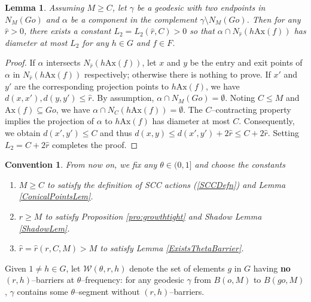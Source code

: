\documentclass{amsart}
\newtheorem{lem}[thm]{Lemma}
\newtheorem{conv}[thm]{Convention}
\theoremstyle{definition}
\theoremstyle{remark}
\newcommand{\ax}{\mathrm{Ax}}
\begin{document}
\begin{lem}\label{ThinRegion}
Assuming $M\ge C$, let $\gamma$ be a geodesic with two endpoints in $N_M(Go)$ and $\alpha$ be a component  in the complement $\gamma\setminus  N_M(Go)$. Then for any $\hat r>0$, there exists a constant $L_2=L_2(\hat r,C)>0$ so that $\alpha\cap N_{\hat r}(h\ax(f))$ has diameter at most $L_2$ for any $h\in G$ and $f\in F$.   
\end{lem}
\begin{proof}
If $\alpha$ intersects $N_{\hat r}(h\ax(f))$, let $x$ and $y$ be the entry and exit points of $\alpha$ in $N_{\hat r}(h\ax(f))$ respectively; otherwise there is nothing to prove. If $x'$ and $y'$ are the corresponding projection points to $h\ax(f)$, we have $d(x,x'), d(y,y')\le \hat r$.
By assumption, $\alpha\cap N_M(Go)=\emptyset$. Noting $C\le M$ and $\ax(f)\subseteq Go$,  we have $\alpha\cap N_C(h\ax(f))=\emptyset$. The  $C$--contracting property implies the projection of $\alpha$ to $h\ax(f)$ has diameter at most $C$.  Consequently, we obtain $d(x',y')\le C$ and thus $d(x,y)\le d(x',y')+2\hat r\le C+2\hat r$. Setting  $L_2=C+2\hat r$  completes the proof.
\end{proof}
\begin{conv}\label{ConventionrM} 
From now on, we fix any $\theta\in (0,1]$ and choose the constants
\begin{enumerate}
     \item 
     $M\ge C$ to satisfy the definition of SCC actions (\ref{SCCDefn}) and Lemma \ref{ConicalPointsLem}.  
     \item 
     $r\ge M$ to satisfy Proposition \ref{pro:growthtight} and Shadow Lemma \ref{ShadowLem}. 
     \item 
     $\hat r=\hat r(r,C,M)>M$ to satisfy Lemma \ref{ExistsThetaBarrier}.%
\end{enumerate}


\end{conv}



Given $1\ne h\in G$, let $\mathcal W(\theta,r,h)$ denote the set  of elements $g$ in $G$ having \textbf{no} $(r, h)$--barriers at $\theta$--frequency:  for any geodesic $\gamma$ from $B(o,M)$ to $B(go,M)$, $\gamma$ contains some $\theta$--segment without $(r, h)$--barriers.  
\end{document}
